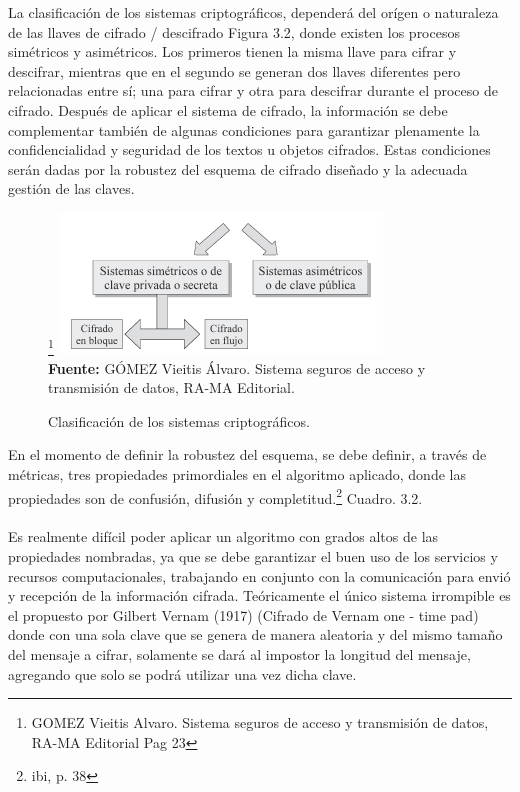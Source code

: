 \documentclass[a4paper,openright,12pt]{book}
\theoremstyle{definition}
\theoremstyle{remark}
\begin{document}
La clasificación de los sistemas criptográficos, dependerá del orígen o naturaleza de las llaves de cifrado / descifrado Figura 3.2, donde existen los procesos simétricos y asimétricos. Los primeros tienen la misma llave para cifrar y descifrar, mientras que en el segundo se generan dos llaves diferentes pero relacionadas entre sí; una para cifrar y otra para descifrar durante el proceso de cifrado. Después de aplicar el sistema de cifrado, la información se debe complementar también de algunas condiciones para garantizar plenamente la confidencialidad y seguridad de los textos u objetos cifrados. Estas condiciones serán dadas por la robustez del esquema de cifrado diseñado y la adecuada gestión de las claves.

\begin{figure}[ht]
\centering
\caption{Clasificación de los sistemas criptográficos.}\footnote{GOMEZ Vieitis Alvaro. Sistema seguros de acceso y transmisión de datos, RA-MA Editorial Pag 23}
\includegraphics[scale=0.8]{ClasificacionCripto}
\label{fig:ClasificacionCripto}
\\\textbf{Fuente:} GÓMEZ Vieitis Álvaro. Sistema seguros de acceso y transmisión de datos, RA-MA Editorial.
\end{figure}

En el momento de definir la robustez del esquema, se debe definir, a través de métricas, tres propiedades primordiales en el algoritmo aplicado, donde las propiedades son de confusión, difusión y completitud.\footnote{ibi, p. 38} Cuadro. 3.2.\\\\Es realmente difícil poder aplicar un algoritmo con grados altos de las propiedades nombradas, ya que se debe garantizar el buen uso de los servicios y recursos computacionales, trabajando en conjunto con la comunicación para envió y recepción de la información cifrada. Teóricamente el único sistema irrompible es el propuesto por Gilbert Vernam (1917) (Cifrado de Vernam one - time pad) donde con una sola clave que se genera de manera aleatoria y del mismo tamaño del mensaje a cifrar, solamente se dará al impostor la longitud del mensaje, agregando que solo se podrá utilizar una vez dicha clave.
\end{document}
